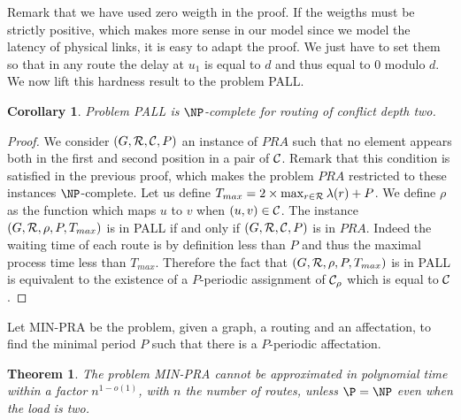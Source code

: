 \documentclass[a4paper,10pt]{article}
\newtheorem{theorem}{Theorem}
\newtheorem{corollary}{Corollary}
\begin{document}
 Remark that we have used zero weigth in the proof. If the weigths must be strictly positive, which makes more sense in our model since
 we model the latency of physical links, it is easy to adapt the proof. We just have to set them so that in any route the delay at $u_1$ is equal to $d$ and thus equal to $0$ modulo $d$. We now lift this hardness result to the problem PALL.

\begin{corollary}
Problem PALL is $\NP$-complete for routing of conflict depth two.
\end{corollary}
\begin{proof}
 We consider $(G,{\cal R},{\cal C},P)$ an instance of $PRA$ such that no element appears both in the first and second position in a pair of ${\cal C}$. Remark that this condition is satisfied in the previous proof, which makes the problem $PRA$ restricted to these instances $\NP$-complete. 
 Let us define $T_{max} = 2 \times \max_{r \in {\cal R}} \lambda(r) + P$. We define $\rho$ as the function which maps 
 $u$ to $v$ when $(u,v) \in {\cal C}$. The instance $(G,{\cal R},\rho,P,T_{max})$ is in PALL if and only if $(G,{\cal R},{\cal C},P)$
 is in $PRA$. Indeed the waiting time of each route is by definition less than $P$ and thus the maximal process time less than $T_{max}$. Therefore the fact that $(G,{\cal R},\rho,P,T_{max})$ is in PALL is equivalent to the existence of a $P$-periodic assignment of ${\cal C}_{\rho}$ which is equal to ${\cal C}$.
\end{proof}
% 
% 

Let MIN-PRA be the problem, given a graph, a routing and an affectation, to find the minimal period $P$ such that there is a $P$-periodic affectation. 

\begin{theorem}
 The problem MIN-PRA cannot be approximated in polynomial time within a factor $n^{1-o(1)}$, with $n$ the number of routes, unless $\P = \NP$ even when the load is two.
\end{theorem}
\end{document}
